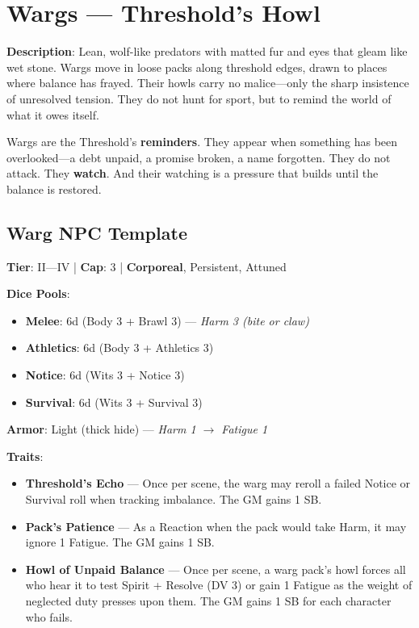 \section{Wargs --- Threshold's Howl}

\textbf{Description}: Lean, wolf-like predators with matted fur and eyes that gleam like wet stone. Wargs move in loose packs along threshold edges, drawn to places where balance has frayed. Their howls carry no malice---only the sharp insistence of unresolved tension. They do not hunt for sport, but to remind the world of what it owes itself.

Wargs are the Threshold's \textbf{reminders}. They appear when something has been overlooked---a debt unpaid, a promise broken, a name forgotten. They do not attack. They \textbf{watch}. And their watching is a pressure that builds until the balance is restored.

\subsection{Warg NPC Template}

\textbf{Tier}: II---IV | \textbf{Cap}: 3 | \textbf{Corporeal}, Persistent, Attuned

\textbf{Dice Pools}:
\begin{itemize}
    \item \textbf{Melee}: 6d (Body 3 + Brawl 3) --- \textit{Harm 3 (bite or claw)}
    \item \textbf{Athletics}: 6d (Body 3 + Athletics 3)
    \item \textbf{Notice}: 6d (Wits 3 + Notice 3)
    \item \textbf{Survival}: 6d (Wits 3 + Survival 3)
\end{itemize}

\textbf{Armor}: Light (thick hide) --- \textit{Harm 1 $\rightarrow$ Fatigue 1}

\textbf{Traits}:
\begin{itemize}
    \item \textbf{Threshold's Echo} --- Once per scene, the warg may reroll a failed Notice or Survival roll when tracking imbalance. The GM gains 1 SB.
    \item \textbf{Pack's Patience} --- As a Reaction when the pack would take Harm, it may ignore 1 Fatigue. The GM gains 1 SB.
    \item \textbf{Howl of Unpaid Balance} --- Once per scene, a warg pack's howl forces all who hear it to test Spirit + Resolve (DV 3) or gain 1 Fatigue as the weight of neglected duty presses upon them. The GM gains 1 SB for each character who fails.
\end{itemize}

